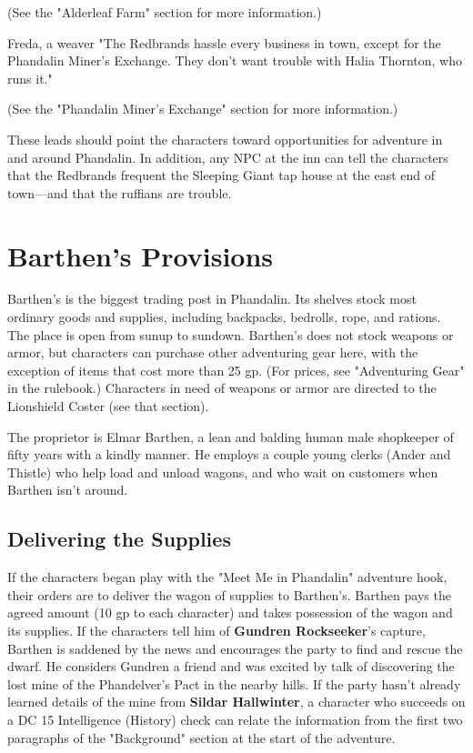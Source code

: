\documentclass[10pt,a4paper,twoside,bg=print,twocolumn,openany,nodeprecatedcode]{dndbook}
\begin{document}
(See the "Alderleaf Farm" section for more information.)

\begin{DndSidebar}[float=!b]{Freda, a weaver}
"The Redbrands hassle every business in town, except for the Phandalin Miner's Exchange. They don't want trouble with Halia Thornton, who runs it."



\end{DndSidebar}

(See the "Phandalin Miner's Exchange" section for more information.)

These leads should point the characters toward opportunities for adventure in and around Phandalin. In addition, any NPC at the inn can tell the characters that the Redbrands frequent the Sleeping Giant tap house at the east end of town—and that the ruffians are trouble.

\section{Barthen's Provisions}
Barthen's is the biggest trading post in Phandalin. Its shelves stock most ordinary goods and supplies, including backpacks, bedrolls, rope, and rations. The place is open from sunup to sundown. Barthen's does not stock weapons or armor, but characters can purchase other adventuring gear here, with the exception of items that cost more than 25 gp. (For prices, see "Adventuring Gear" in the rulebook.) Characters in need of weapons or armor are directed to the Lionshield Coster (see that section).

The proprietor is Elmar Barthen, a lean and balding human male shopkeeper of fifty years with a kindly manner. He employs a couple young clerks (Ander and Thistle) who help load and unload wagons, and who wait on customers when Barthen isn't around.

\subsection{Delivering the Supplies}
If the characters began play with the "Meet Me in Phandalin" adventure hook, their orders are to deliver the wagon of supplies to Barthen's. Barthen pays the agreed amount (10 gp to each character) and takes possession of the wagon and its supplies. If the characters tell him of \textbf{Gundren Rockseeker}'s capture, Barthen is saddened by the news and encourages the party to find and rescue the dwarf. He considers Gundren a friend and was excited by talk of discovering the lost mine of the Phandelver's Pact in the nearby hills. If the party hasn't already learned details of the mine from \textbf{Sildar Hallwinter}, a character who succeeds on a DC 15 Intelligence (History) check can relate the information from the first two paragraphs of the "Background" section at the start of the adventure.
\end{document}
